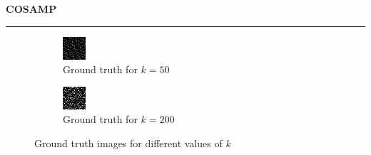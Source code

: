 \documentclass[a4paper,12pt]{article}
\newenvironment{solution}[2][]{%
    \begin{mdframed}[linecolor=blue!70!black, linewidth=2pt, roundcorner=10pt, backgroundcolor=yellow!10!white, skipabove=12pt, skipbelow=12pt]%
        \textbf{\large #2}
        \par\noindent\rule{\textwidth}{0.4pt}
}{
    \end{mdframed}
}
\begin{document}
\begin{solution}{COSAMP}
\begin{figure}[H]
\begin{subfigure}[t]{0.32\textwidth}
          \includegraphics[width=\textwidth]{../images/cosamp/Ground_truth_k_50.png}
          \caption{Ground truth for $k = 50$}
      \end{subfigure}
      \begin{subfigure}[t]{0.32\textwidth}
          \centering
          \includegraphics[width=\textwidth]{../images/cosamp/Ground_truth_k_200.png}
          \caption{Ground truth for $k = 200$}
      \end{subfigure}
      \caption{Ground truth images for different values of $k$}
      \label{fig:ground_truth}
    \end{figure}
    

\end{solution}
\end{document}
